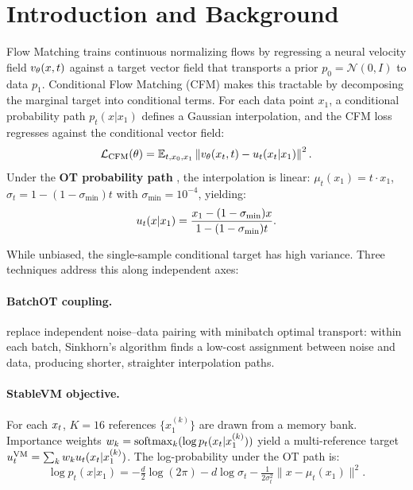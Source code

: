 \section{Introduction and Background}

Flow Matching \citep{lipman2023flow} trains continuous normalizing flows by regressing a neural velocity field $v_\theta(x,t)$ against a target vector field that transports a prior $p_0 = \mathcal{N}(0,I)$ to data $p_1$. Conditional Flow Matching (CFM) makes this tractable by decomposing the marginal target into conditional terms. For each data point $x_1$, a conditional probability path $p_t(x|x_1)$ defines a Gaussian interpolation, and the CFM loss regresses against the conditional vector field:
\begin{equation}
    \mathcal{L}_{\text{CFM}}(\theta) = \mathbb{E}_{t,x_0,x_1} \left\| v_\theta(x_t, t) - u_t(x_t | x_1) \right\|^2.
    \label{eq:cfm_loss}
\end{equation}
Under the \textbf{OT probability path} \citep{lipman2023flow}, the interpolation is linear: $\mu_t(x_1) = t \cdot x_1$, $\sigma_t = 1-(1-\sigma_{\min})t$ with $\sigma_{\min}=10^{-4}$, yielding:
\begin{equation}
    u_t(x|x_1) = \frac{x_1 - (1-\sigma_{\min})x}{1-(1-\sigma_{\min})t}.
    \label{eq:ot_vf}
\end{equation}

While unbiased, the single-sample conditional target has high variance. Three techniques address this along independent axes:

\paragraph{BatchOT coupling.} \citet{tong2024improving} replace independent noise--data pairing with minibatch optimal transport: within each batch, Sinkhorn's algorithm \citep{cuturi2013sinkhorn} finds a low-cost assignment between noise and data, producing shorter, straighter interpolation paths.

\paragraph{StableVM objective.} For each $x_t$, $K{=}16$ references $\{x_1^{(k)}\}$ are drawn from a memory bank. Importance weights $w_k = \operatorname{softmax}_k(\log p_t(x_t|x_1^{(k)}))$ yield a multi-reference target $u_t^{\text{VM}} = \sum_k w_k u_t(x_t|x_1^{(k)})$. The log-probability under the OT path is:
\begin{equation}
    \log p_t(x|x_1) = -\tfrac{d}{2}\log(2\pi) - d\log\sigma_t - \tfrac{1}{2\sigma_t^2}\|x - \mu_t(x_1)\|^2.
    \label{eq:log_prob}
\end{equation}

